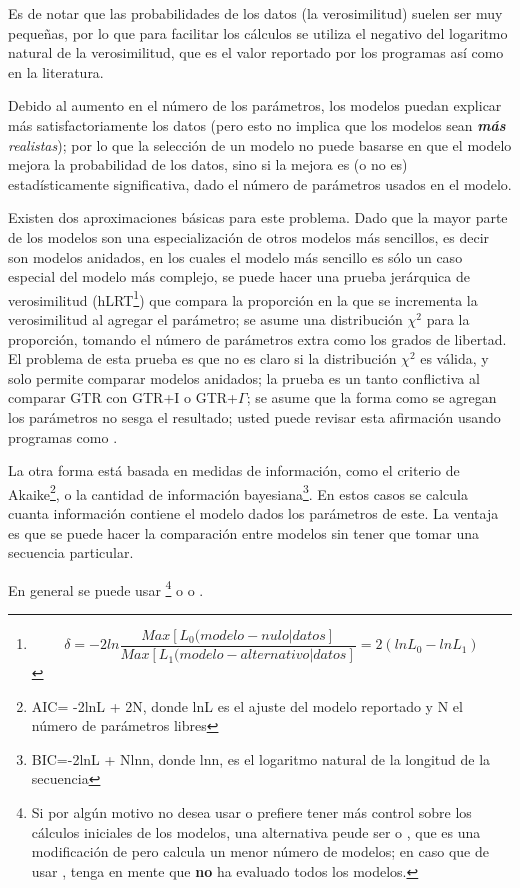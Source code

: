 Es de notar que las probabilidades de los datos (la verosimilitud) suelen ser muy peque\~nas, por lo que para facilitar los c\'alculos se utiliza el negativo del logaritmo natural de la verosimilitud, que es el valor reportado por los programas as\'i como en la literatura.

Debido al aumento en el n\'umero de los par\'ametros, los modelos puedan explicar m\'as satisfactoriamente los datos (pero esto no implica que los modelos sean \emph{\textbf{m\'as} realistas}); por lo que la selecci\'on de un modelo no puede basarse en que el modelo mejora la probabilidad de los datos, sino si la mejora es (o no es) estad\'isticamente significativa, dado el n\'umero de par\'ametros usados en el modelo.

Existen dos aproximaciones b\'asicas para este problema. Dado que la mayor parte de los modelos son una especializaci\'on de otros modelos m\'as sencillos, es decir son modelos anidados, en los cuales el modelo m\'as sencillo es s\'olo un caso especial del modelo m\'as complejo, se puede hacer una prueba jer\'arquica de verosimilitud (hLRT\footnote
{\begin{equation}
\delta = -2 ln \frac{Max[L_{0}(modelo-nulo|datos]}{Max[L_{1}(modelo-alternativo|datos]} = 2 (ln L_{0} - ln L_{1}) 
\end{equation}
}) que compara la proporci\'on en la que se incrementa la verosimilitud al agregar el par\'ametro; se asume una distribuci\'on $\chi^2$  para la proporci\'on, tomando el n\'umero de par\'ametros extra como los grados de libertad. El problema de esta prueba es que no es claro si la distribuci\'on $\chi^2$ es v\'alida, y solo permite comparar modelos anidados; la prueba  es un tanto conflictiva al comparar GTR con GTR+I o GTR+$\Gamma$; se asume que la forma como se agregan los par\'ametros no sesga el resultado; usted puede revisar esta afirmaci\'on usando programas como .

La otra forma est\'a basada en medidas de informaci\'on, como el criterio de Akaike\footnote{AIC= -2lnL + 2N, donde lnL es el ajuste del modelo reportado y N el n\'umero de par\'ametros libres}, 
o la cantidad de informaci\'on bayesiana\footnote{BIC=-2lnL + Nlnn, donde lnn, es el logaritmo natural de la longitud de la secuencia}. 
En estos casos se calcula cuanta informaci\'on contiene el modelo dados los par\'ametros de este. La ventaja es que se puede hacer la comparaci\'on entre modelos sin tener que tomar una secuencia particular.


En general se puede usar  \footnote{Si por alg\'un motivo no desea usar  o prefiere tener m\'as control sobre los c\'alculos iniciales de los modelos, una alternativa peude ser   o , que es una modificaci\'on de  pero calcula un menor n\'umero de modelos; en caso que de usar , tenga en mente que \textbf{no} ha evaluado todos los modelos.}
o  o . 

